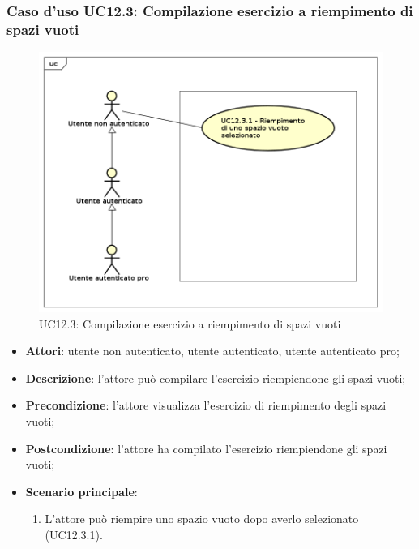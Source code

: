 \subsubsection{Caso d'uso UC12.3: Compilazione esercizio a riempimento di spazi vuoti}
\label{UC12.3}
\begin{figure}[h]
	\centering
	\includegraphics[scale=0.5]{UML/UC12_3.png}
	\caption{UC12.3: Compilazione esercizio a riempimento di spazi vuoti}
\end{figure}
\begin{itemize}
\item \textbf{Attori}: utente non autenticato, utente autenticato, utente autenticato pro;
\item \textbf{Descrizione}: l'attore può compilare l'esercizio riempiendone gli spazi vuoti;
\item \textbf{Precondizione}: l'attore visualizza l'esercizio di riempimento degli spazi vuoti;
\item \textbf{Postcondizione}: l'attore ha compilato l'esercizio riempiendone gli spazi vuoti;
\item \textbf{Scenario principale}: 
\begin{enumerate}
\item L'attore può riempire uno spazio vuoto dopo averlo selezionato (UC12.3.1).
\end{enumerate}
\end{itemize}

